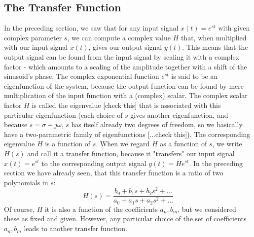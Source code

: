 
\subsection{The Transfer Function}   
In the preceding section, we saw that for any input signal $x(t) = e^{st}$ with given complex parameter $s$, we can compute a complex value $H$ that, when multiplied with our input signal $x(t)$, gives our output signal $y(t)$. This means that the output signal can be found from the input signal by scaling it with a complex factor - which amounts to a scaling of the amplitude together with a shift of the sinusoid's phase. The complex exponential function $e^{st}$ is said to be an eigenfunction of the system, because the output function can be found by mere multiplication of the input function with a (complex) scalar. The complex scalar factor $H$ is called the eigenvalue [check this] that is associated with this particular eigenfunction (each choice of $s$ gives another eigenfunction, and because $s = \sigma + j \omega$, $s$ has itself already two degrees of freedom, so we basically have a two-parametric family of eigenfunctions [...check this]). The corresponding eigenvalue $H$ is a function of $s$. When we regard $H$ as a function of $s$, we write $H(s)$ and call it a transfer function, because it "transfers" our input signal $x(t) = e^{st}$ to the corresponding output signal $y(t) = H e^{st}$. In the preceding section we have already seen, that this transfer function is a ratio of two polynomials in $s$:
\begin{equation}
 H(s) = \frac{b_0 + b_1 s + b_2 s^2 + \ldots}{a_0 + a_1 s + a_2 s^2 + \ldots}
\end{equation} 
Of course, $H$ it is also a function of the coefficients $a_n, b_m$, but we considered these as fixed and given. However, any particular choice of the set of coefficients $a_n, b_m$ leads to another transfer function.

